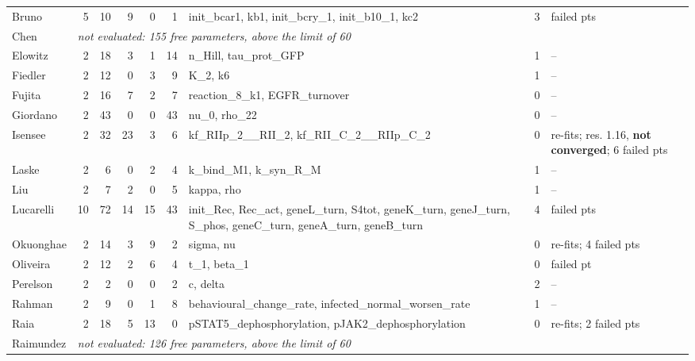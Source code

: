 \begin{longtable}{@{}lrrrrr>{\raggedright}p{2.5cm}r>{\raggedright\arraybackslash}p{2.3cm}@{}}
Bruno & 5 & 10 & 9 & 0 & 1 & init\_\allowbreak{}bcar1, kb1, init\_\allowbreak{}bcry\_\allowbreak{}1, init\_\allowbreak{}b10\_\allowbreak{}1, kc2 & 3 & 2 failed pts \\
Chen & \multicolumn{8}{l}{\emph{not evaluated: 155 free parameters, above the limit of 60}} \\
Elowitz & 2 & 18 & 3 & 1 & 14 & n\_\allowbreak{}Hill, tau\_\allowbreak{}prot\_\allowbreak{}GFP & 1 & -- \\
Fiedler & 2 & 12 & 0 & 3 & 9 & K\_\allowbreak{}2, k6 & 1 & -- \\
Fujita & 2 & 16 & 7 & 2 & 7 & reaction\_\allowbreak{}8\_\allowbreak{}k1, EGFR\_\allowbreak{}turnover & 0 & -- \\
Giordano & 2 & 43 & 0 & 0 & 43 & nu\_\allowbreak{}0, rho\_\allowbreak{}22 & 0 & -- \\
Isensee & 2 & 32 & 23 & 3 & 6 & kf\_\allowbreak{}RIIp\_\allowbreak{}2\_\allowbreak{}\_\allowbreak{}RII\_\allowbreak{}2, kf\_\allowbreak{}RII\_\allowbreak{}C\_\allowbreak{}2\_\allowbreak{}\_\allowbreak{}RIIp\_\allowbreak{}C\_\allowbreak{}2 & 0 & 3 re-fits; res. 1.16, \textbf{not converged}; 6 failed pts \\
Laske & 2 & 6 & 0 & 2 & 4 & k\_\allowbreak{}bind\_\allowbreak{}M1, k\_\allowbreak{}syn\_\allowbreak{}R\_\allowbreak{}M & 1 & -- \\
Liu & 2 & 7 & 2 & 0 & 5 & kappa, rho & 1 & -- \\
Lucarelli & 10 & 72 & 14 & 15 & 43 & init\_\allowbreak{}Rec, Rec\_\allowbreak{}act, geneL\_\allowbreak{}turn, S4tot, geneK\_\allowbreak{}turn, geneJ\_\allowbreak{}turn, S\_\allowbreak{}phos, geneC\_\allowbreak{}turn, geneA\_\allowbreak{}turn, geneB\_\allowbreak{}turn & 4 & 2 failed pts \\
Okuonghae & 2 & 14 & 3 & 9 & 2 & sigma, nu & 0 & 2 re-fits; 4 failed pts \\
Oliveira & 2 & 12 & 2 & 6 & 4 & t\_\allowbreak{}1, beta\_\allowbreak{}1 & 0 & 1 failed pt \\
Perelson & 2 & 2 & 0 & 0 & 2 & c, delta & 2 & -- \\
Rahman & 2 & 9 & 0 & 1 & 8 & behavioural\_\allowbreak{}change\_\allowbreak{}rate, infected\_\allowbreak{}normal\_\allowbreak{}worsen\_\allowbreak{}rate & 1 & -- \\
Raia & 2 & 18 & 5 & 13 & 0 & pSTAT5\_\allowbreak{}dephosphorylation, pJAK2\_\allowbreak{}dephosphorylation & 0 & 4 re-fits; 2 failed pts \\
Raimundez & \multicolumn{8}{l}{\emph{not evaluated: 126 free parameters, above the limit of 60}} \\

\end{longtable}

